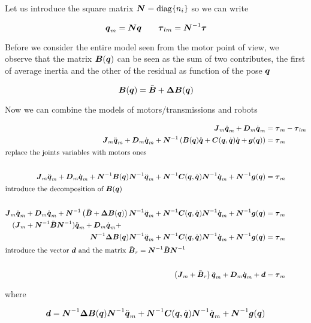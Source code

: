Let us introduce the square matrix $\boldsymbol{N} = \operatorname{diag}\{n_i\}$ so we can write

\[
    \boldsymbol{q}_m = \boldsymbol{N} \boldsymbol{q} \qquad \boldsymbol{\tau}_{lm} = \boldsymbol{N}^{-1} \boldsymbol{\tau}
\]

Before we consider the entire model seen from the motor point of view, we observe that the matrix $\boldsymbol{B}(\boldsymbol{q})$ can be seen as the sum of two contributes, the first of average inertia and the other of the residual as function of the pose $\boldsymbol{q}$

\[
    \boldsymbol{B}(\boldsymbol{q}) = \bar{\boldsymbol{B}} + \boldsymbol{\Delta B}(\boldsymbol{q})
\]

Now we can combine the models of motors/transmissions and robots

\begin{align*}
    \matr J_m\ddq_m + \matr D_m \dq_m &= \vect \tau_m - \vect \tau_{lm} \\
    \matr J_m\ddq_m + \matr D_m \dq_m + \matr N^{-1} \left( \matr{B}(\q)\ddq +
    \matr{C}(\q,\dq)\dq + \vect{g}(\q) \right) &= \vect \tau_m \\
    \intertext{replace the joints variables with motors ones} \\
    \matr J_m\ddq_m + \matr D_m \dq_m + \matr N^{-1} \matr{B}(\q) \matr N^{-1} \ddq_m +
    \matr N^{-1} \matr{C}(\q,\dq) \matr N^{-1} \dq_m +
    \matr N^{-1} \vect{g}(\q) &= \vect \tau_m \\
    \intertext{introduce the decomposition of $\matr B(\q)$} \\
    \matr J_m\ddq_m + \matr D_m \dq_m + \matr N^{-1} \left(\bar{\matr B} + \matr{\Delta B}(\q)\right) \matr N^{-1} \ddq_m +
    \matr N^{-1} \matr{C}(\q,\dq) \matr N^{-1} \dq_m +
    \matr N^{-1} \vect{g}(\q) &= \vect \tau_m \\
    (\matr J_m + \matr N^{-1} \bar{\matr B} \matr N^{-1} )\ddq_m + \matr D_m \dq_m + \hspace{7cm} \\
    \matr N^{-1} \matr{\Delta B}(\q) \matr N^{-1} \ddq_m +
    \matr N^{-1} \matr{C}(\q,\dq) \matr N^{-1} \dq_m +
    \matr N^{-1} \vect{g}(\q) &= \vect \tau_m \\
    \intertext{introduce the vector $\vect d$ and the matrix $\bar{\matr B}_r = \matr N^{-1} \bar{\matr B} \matr N^{-1}$} \\
    \left(\matr J_m + \bar{\matr B}_r \right)\ddq_m + \matr D_m \dq_m + \vect d &= \vect \tau_m
\end{align*}

where

\[
    \boldsymbol{d} = \boldsymbol{N}^{-1} \boldsymbol{\Delta B}(\boldsymbol{q}) \boldsymbol{N}^{-1} \ddot{\boldsymbol{q}}_m +
    \boldsymbol{N}^{-1} \boldsymbol{C}(\boldsymbol{q},\dot{\boldsymbol{q}}) \boldsymbol{N}^{-1} \dot{\boldsymbol{q}}_m + \boldsymbol{N}^{-1} \boldsymbol{g}(\boldsymbol{q})
\]

